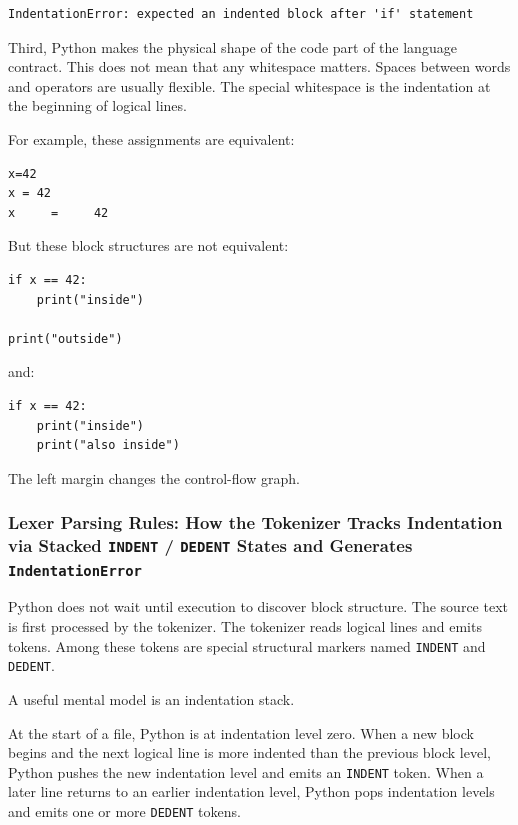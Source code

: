 \documentclass[a4paper,twoside]{report}
\begin{document}
\begin{verbatim}
IndentationError: expected an indented block after 'if' statement
\end{verbatim}

Third, Python makes the physical shape of the code part of the language contract. This does not mean that any whitespace matters. Spaces between words and operators are usually flexible. The special whitespace is the indentation at the beginning of logical lines.

For example, these assignments are equivalent:

\begin{verbatim}
x=42
x = 42
x     =     42
\end{verbatim}

But these block structures are not equivalent:

\begin{verbatim}
if x == 42:
    print("inside")

print("outside")
\end{verbatim}

and:

\begin{verbatim}
if x == 42:
    print("inside")
    print("also inside")
\end{verbatim}

The left margin changes the control-flow graph.

\subsubsection{Lexer Parsing Rules: How the Tokenizer Tracks Indentation via Stacked \texttt{INDENT} / \texttt{DEDENT} States and Generates \texttt{IndentationError}}

Python does not wait until execution to discover block structure. The source text is first processed by the tokenizer. The tokenizer reads logical lines and emits tokens. Among these tokens are special structural markers named \texttt{INDENT} and \texttt{DEDENT}.

A useful mental model is an indentation stack.

At the start of a file, Python is at indentation level zero. When a new block begins and the next logical line is more indented than the previous block level, Python pushes the new indentation level and emits an \texttt{INDENT} token. When a later line returns to an earlier indentation level, Python pops indentation levels and emits one or more \texttt{DEDENT} tokens.
\end{document}
